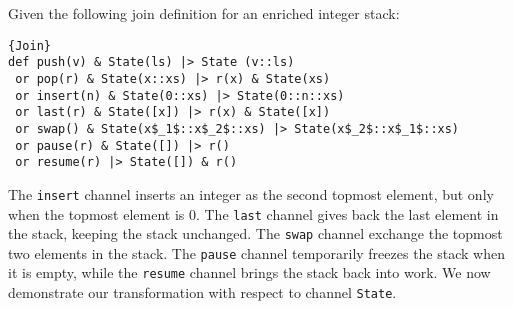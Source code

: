 \documentclass{LMCS}
\let \lst \lstinline
\renewcommand{\_}{\mathord{\rule[-.25ex]{1ex}{.15ex}}}
\begin{document}
Given the following join definition for an enriched integer stack:
\begin{lstlisting}{Join}
def push(v) & State(ls) |> State (v::ls) 
 or pop(r) & State(x::xs) |> r(x) & State(xs)
 or insert(n) & State(0::xs) |> State(0::n::xs)
 or last(r) & State([x]) |> r(x) & State([x])
 or swap() & State(x$_1$::x$_2$::xs) |> State(x$_2$::x$_1$::xs)
 or pause(r) & State([]) |> r()
 or resume(r) |> State([]) & r()
\end{lstlisting}
The \lst"insert" channel inserts an integer as the second topmost
element, but only when the topmost element is $0$. The \lst"last"
channel gives back the last element in the stack, keeping the stack
unchanged.  The \lst"swap" channel exchange the topmost two elements
in the stack.  The \lst"pause" channel temporarily freezes the stack
when it is empty, while the \lst"resume" channel brings the stack back
into work.  We now demonstrate our transformation with respect to channel
\lst"State".
\def\one{1}
\def\two{2}
\def\three{3}
\def\four{4}
\def\five{5}
\def\six{6}
\def\seven{7}
\def\eight{8}
\end{document}
